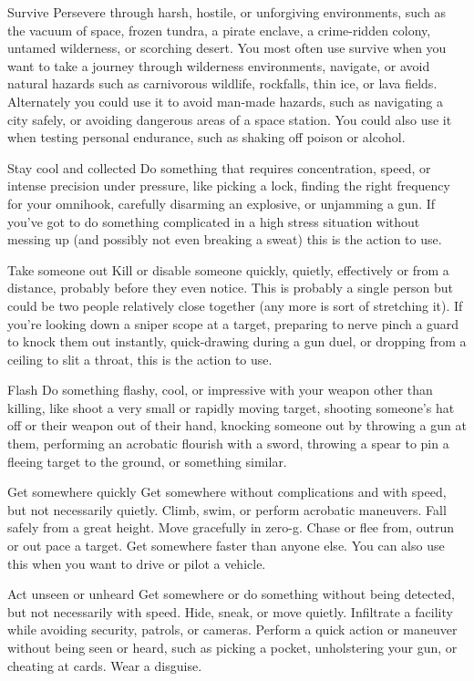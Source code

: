 Survive
Persevere through harsh, hostile, or unforgiving environments, such as the vacuum of space,
frozen tundra, a pirate enclave, a crime-ridden colony, untamed wilderness, or scorching desert.
You most often use survive when you want to take a journey through wilderness environments,
navigate, or avoid natural hazards such as carnivorous wildlife, rockfalls, thin ice, or lava fields.
Alternately you could use it to avoid man-made hazards, such as navigating a city safely, or
avoiding dangerous areas of a space station. You could also use it when testing personal
endurance, such as shaking off poison or alcohol.

Stay cool and collected
Do something that requires concentration, speed, or intense precision under pressure, like picking
a lock, finding the right frequency for your omnihook, carefully disarming an explosive, or
unjamming a gun. If you’ve got to do something complicated in a high stress situation without
messing up (and possibly not even breaking a sweat) this is the action to use.




Take someone out
Kill or disable someone quickly, quietly, effectively or from a distance, probably before they even
notice. This is probably a single person but could be two people relatively close together (any
more is sort of stretching it). If you’re looking down a sniper scope at a target, preparing to nerve
pinch a guard to knock them out instantly, quick-drawing during a gun duel, or dropping from a
ceiling to slit a throat, this is the action to use.

Flash
Do something flashy, cool, or impressive with your weapon other than killing, like shoot a very
small or rapidly moving target, shooting someone’s hat off or their weapon out of their hand,
knocking someone out by throwing a gun at them, performing an acrobatic flourish with a sword,
throwing a spear to pin a fleeing target to the ground, or something similar.

Get somewhere quickly
Get somewhere without complications and with speed, but not necessarily quietly. Climb, swim, or
perform acrobatic maneuvers. Fall safely from a great height. Move gracefully in zero-g. Chase or
flee from, outrun or out pace a target. Get somewhere faster than anyone else. You can also use
this when you want to drive or pilot a vehicle.

Act unseen or unheard
Get somewhere or do something without being detected, but not necessarily with speed. Hide,
sneak, or move quietly. Infiltrate a facility while avoiding security, patrols, or cameras. Perform a
quick action or maneuver without being seen or heard, such as picking a pocket, unholstering
your gun, or cheating at cards. Wear a disguise.

